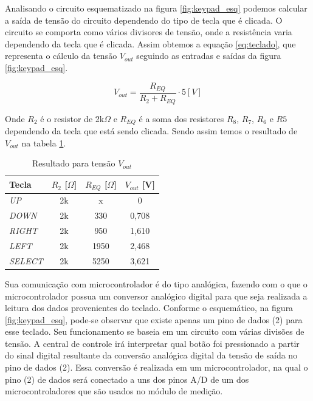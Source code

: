         Analisando o circuito esquematizado na figura \ref{fig:keypad_esq} podemos calcular a saída de tensão do circuito dependendo do tipo de tecla que é clicada. O circuito se comporta como vários divisores de tensão, onde a resistência varia dependendo da tecla que é clicada. Assim obtemos a equação \ref{eq:teclado}, que representa o cálculo da tensão $V_{out}$ seguindo as entradas e saídas da figura \ref{fig:keypad_esq}.
        
        \begin{equation}\label{eq:teclado}
            V_{out} = \frac{R_{EQ}}{R_2 + R_{EQ}} \cdot 5 [V]
        \end{equation}
        
        Onde $R_2$ é o resistor de 2k$\Omega$ e $R_{EQ}$ é a soma dos resistores $R_8$, $R_7$, $R_6$ e $R5$ dependendo da tecla que está sendo clicada. Sendo assim temos o resultado de $V_{out}$ na tabela \ref{tab:teclado}.
        
        \begin{table}[H]
        \centering
        \caption{Resultado para tensão $V_{out}$}
        \label{tab:teclado}
        \begin{adjustbox}{max width = \textwidth}
            \begin{tabular}{|l|c|c|c|}
                \hline
                \rowcolor[HTML]{A8DADC}
                \textbf{Tecla} & $R_2$ [$\Omega$] & $R_{EQ}$ [$\Omega$] & $V_{out}$ [V] \\ \hline
                \textit{UP} & 2k & x & 0 \\ \hline
                \textit{DOWN} & 2k & 330  & 0,708 \\ \hline
                \textit{RIGHT} & 2k & 950 & 1,610 \\ \hline
                \textit{LEFT} & 2k & 1950 & 2,468 \\ \hline
                \textit{SELECT} & 2k & 5250 & 3,621 \\ \hline
            \end{tabular}
        \end{adjustbox}
        \end{table}
            
        
        Sua comunicação com microcontrolador é do tipo analógica, fazendo com o que o microcontrolador possua um conversor analógico digital para que seja realizada a leitura dos dados provenientes do teclado. Conforme o esquemático, na figura \ref{fig:keypad_esq}, pode-se observar que existe apenas um pino de dados (2) para esse teclado. Seu funcionamento se baseia em um circuito com várias divisões de tensão. A central de controle irá interpretar qual botão foi pressionado a partir do sinal digital resultante da conversão analógica digital da tensão de saída no pino de dados (2). Essa conversão é realizada em um microcontrolador, na qual o pino (2) de dados será conectado a uns dos pinos A/D de um dos microcontroladores que são usados no módulo de medição.
        
